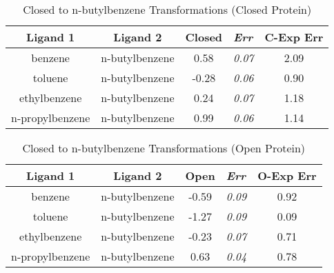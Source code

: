 \documentclass[T4paper.tex]{subfiles}
\begin{document}
\begin{table}[!htb]
\centering
\caption{Closed to n-butylbenzene Transformations (Closed Protein)}
\label{tbl:C-nbutyl_closed}
\begin{tabular}{|c|c|c|l|c|}
\hline
\textbf{Ligand 1}                       & \textbf{Ligand 2}                      & {\color[HTML]{800080} \textbf{Closed}} & {\color[HTML]{800080} \textit{Err}} & \textbf{C-Exp Err}           \\ \hline
\cellcolor[HTML]{800080}benzene         & \cellcolor[HTML]{00FFFF}n-butylbenzene & 0.58                                   & \textit{0.07}                       & \cellcolor[HTML]{FFCCC9}2.09 \\ \hline
\cellcolor[HTML]{800080}toluene         & \cellcolor[HTML]{00FFFF}n-butylbenzene & -0.28                                  & \textit{0.06}                       & \cellcolor[HTML]{9AFF99}0.90 \\ \hline
\cellcolor[HTML]{800080}ethylbenzene    & \cellcolor[HTML]{00FFFF}n-butylbenzene & 0.24                                   & \textit{0.07}                       & \cellcolor[HTML]{FFCCC9}1.18 \\ \hline
\cellcolor[HTML]{800080}n-propylbenzene & \cellcolor[HTML]{00FFFF}n-butylbenzene & 0.99                                   & \textit{0.06}                       & \cellcolor[HTML]{FFCCC9}1.14 \\ \hline
\end{tabular}
\end{table}

\begin{table}[!htb]
\centering
\caption{Closed to n-butylbenzene Transformations (Open Protein)}
\label{tbl:C-nbutyl_open}
\begin{tabular}{|c|c|c|l|c|}
\hline
\textbf{Ligand 1}                       & \textbf{Ligand 2}                      & {\color[HTML]{008000} \textbf{Open}} & {\color[HTML]{008000} \textit{Err}} & \textbf{O-Exp Err}           \\ \hline
\cellcolor[HTML]{800080}benzene         & \cellcolor[HTML]{00FFFF}n-butylbenzene & -0.59                                & \textit{0.09}                       & \cellcolor[HTML]{9AFF99}0.92 \\ \hline
\cellcolor[HTML]{800080}toluene         & \cellcolor[HTML]{00FFFF}n-butylbenzene & -1.27                                & \textit{0.09}                       & \cellcolor[HTML]{9AFF99}0.09 \\ \hline
\cellcolor[HTML]{800080}ethylbenzene    & \cellcolor[HTML]{00FFFF}n-butylbenzene & -0.23                                & \textit{0.07}                       & \cellcolor[HTML]{9AFF99}0.71 \\ \hline
\cellcolor[HTML]{800080}n-propylbenzene & \cellcolor[HTML]{00FFFF}n-butylbenzene & 0.63                                 & \textit{0.04}                       & \cellcolor[HTML]{9AFF99}0.78 \\ \hline
\end{tabular}
\end{table}
\end{document}
